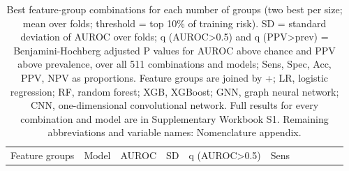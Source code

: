 \documentclass[journal]{IEEEtran}
\begin{document}
{\scriptsize
\begin{longtable}[]{@{}
  >{\raggedright\arraybackslash}p{}
  >{\raggedright\arraybackslash}p{}
  >{\raggedright\arraybackslash}p{}
  >{\raggedright\arraybackslash}p{}
  >{\raggedright\arraybackslash}p{}
  >{\raggedright\arraybackslash}p{}
  >{\raggedright\arraybackslash}p{}
  >{\raggedright\arraybackslash}p{}
  >{\raggedright\arraybackslash}p{}
  >{\raggedright\arraybackslash}p{}
  >{\raggedright\arraybackslash}p{}@{}}
\caption{Best feature-group combinations for each number of groups (two
best per size; mean over folds; threshold = top 10\% of training risk).
SD = standard deviation of AUROC over folds; q (AUROC\textgreater0.5)
and q (PPV\textgreater prev) = Benjamini-Hochberg adjusted P values for
AUROC above chance and PPV above prevalence, over all 511 combinations
and models; Sens, Spec, Acc, PPV, NPV as proportions. Feature groups are
joined by +; LR, logistic regression; RF, random forest; XGB, XGBoost;
GNN, graph neural network; CNN, one-dimensional convolutional network.
Full results for every combination and model are in Supplementary
Workbook S1. Remaining abbreviations and variable names: Nomenclature
appendix.}\tabularnewline
\toprule\noalign{}
\begin{minipage}[b]{\linewidth}\raggedright
Feature groups
\end{minipage} & \begin{minipage}[b]{\linewidth}\raggedright
Model
\end{minipage} & \begin{minipage}[b]{\linewidth}\raggedright
AUROC
\end{minipage} & \begin{minipage}[b]{\linewidth}\raggedright
SD
\end{minipage} & \begin{minipage}[b]{\linewidth}\raggedright
q (AUROC\textgreater0.5)
\end{minipage} & \begin{minipage}[b]{\linewidth}\raggedright
Sens
\end{minipage} & \begin{minipage}[b]{\linewidth}\raggedright

\end{minipage}
\end{longtable}}
\end{document}
